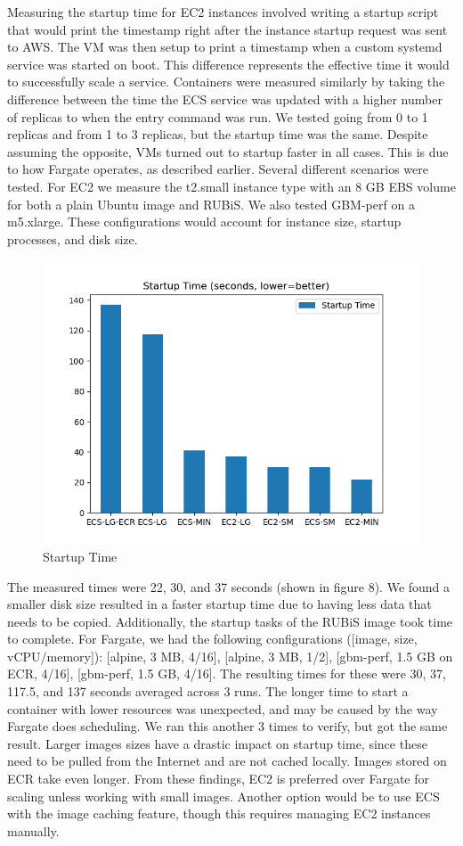 \documentclass[11pt]{article}
\begin{document}
Measuring the startup time for EC2 instances involved writing a startup script that would print the timestamp right after the instance startup request was sent to AWS. The VM was then setup to print a timestamp when a custom systemd service was started on boot. This difference represents the effective time it would to successfully scale a service. Containers were measured similarly by taking the difference between the time the ECS service was updated with a higher number of replicas to when the entry command was run. We tested going from 0 to 1 replicas and from 1 to 3 replicas, but the startup time was the same. Despite assuming the opposite, VMs turned out to startup faster in all cases. This is due to how Fargate operates, as described earlier. Several different scenarios were tested. For EC2 we measure the t2.small instance type with an 8 GB EBS volume for both a plain Ubuntu image and RUBiS. We also tested GBM-perf on a m5.xlarge. These configurations would account for instance size, startup processes, and disk size.

\begin{figure}[H]
  \centering
    \includegraphics[width=0.55\linewidth]{startup_time.png}
    \caption{Startup Time}
    \label{fig:disk}
\end{figure}

The measured times were 22, 30, and 37 seconds (shown in figure 8). We found a smaller disk size resulted in a faster startup time due to having less data that needs to be copied. Additionally, the startup tasks of the RUBiS image took time to complete. For Fargate, we had the following configurations ([image, size, vCPU/memory]): [alpine, 3 MB, 4/16], [alpine, 3 MB, 1/2], [gbm-perf, 1.5 GB on ECR, 4/16], [gbm-perf, 1.5 GB, 4/16]. The resulting times for these were 30, 37, 117.5, and 137 seconds averaged across 3 runs. The longer time to start a container with lower resources was unexpected, and may be caused by the way Fargate does scheduling. We ran this another 3 times to verify, but got the same result. Larger images sizes have a drastic impact on startup time, since these need to be pulled from the Internet and are not cached locally. Images stored on ECR take even longer. From these findings, EC2 is preferred over Fargate for scaling unless working with small images. Another option would be to use ECS with the image caching feature, though this requires managing EC2 instances manually.
\end{document}
